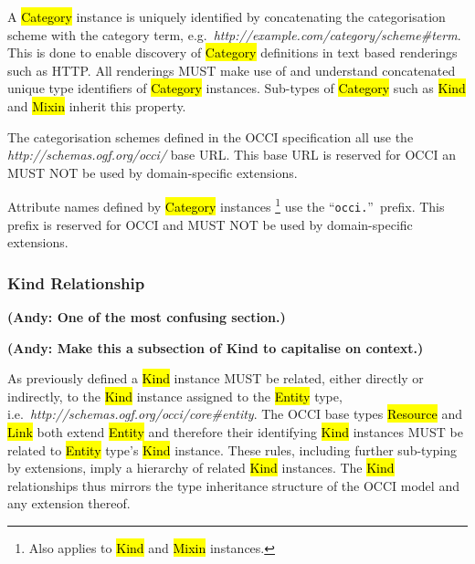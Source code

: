 \documentclass[10pt,a4paper]{article}
\begin{document}

A \hl{Category} instance is uniquely identified by concatenating the
categorisation scheme with the category term,
e.g.~\textit{http://example.com/category/scheme\#term}.
This is done to enable discovery of \hl{Category} definitions in text based
renderings such as HTTP. All renderings MUST make use of and understand
concatenated unique type identifiers of \hl{Category} instances.
%
Sub-types of \hl{Category} such as \hl{Kind} and \hl{Mixin} inherit this property.

The categorisation schemes defined in the OCCI specification all use the
\textit{http://schemas.ogf.org/occi/} base URL. This base URL is reserved for
OCCI an MUST NOT be used by domain-specific extensions.

Attribute names defined by \hl{Category} instances%
\footnote{Also applies to \hl{Kind} and \hl{Mixin} instances.}
use the ``\texttt{occi.}''~prefix.  This prefix is reserved for OCCI and MUST NOT
be used by domain-specific extensions.

\subsubsection{Kind Relationship}
\label{sec:kind_relationship}

\textbf{(Andy: One of the most confusing section.)}

\textbf{(Andy: Make this a subsection of Kind to capitalise on context.)}

As previously defined a \hl{Kind} instance MUST be related, either directly or
indirectly, to the \hl{Kind} instance assigned to the \hl{Entity} type,
i.e.~\textit{http://schemas.ogf.org/occi/core\#entity}.
%
The OCCI base types \hl{Resource} and \hl{Link} both extend \hl{Entity} and
therefore their identifying \hl{Kind} instances MUST be related to \hl{Entity}
type's \hl{Kind} instance.
%
These rules, including further sub-typing by extensions, imply a hierarchy of
related \hl{Kind} instances. The \hl{Kind} relationships thus mirrors the type
inheritance structure of the OCCI model and any extension thereof.
\end{document}
